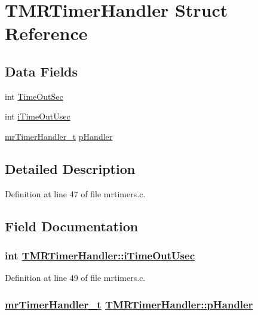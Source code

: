 \hypertarget{structTMRTimerHandler}{
\section{TMRTimer\-Handler Struct Reference}
\label{structTMRTimerHandler}
}
\subsection*{Data Fields}
\begin{CompactItemize}
\item 
int \hyperlink{structTMRTimerHandler_2da8162b04f70a60ac2bc7b37d97e5a1}{Time\-Out\-Sec}
\item 
int \hyperlink{structTMRTimerHandler_ceccedecb73edf56b8aece303bd50521}{i\-Time\-Out\-Usec}
\item 
\hyperlink{mrtimers_8h_9c199b5712594663db80db9a9ec6d6e0}{mr\-Timer\-Handler\_\-t} \hyperlink{structTMRTimerHandler_a96173b2d71794fe6ce4c1b4765e81e8}{p\-Handler}
\end{CompactItemize}


\subsection{Detailed Description}




Definition at line 47 of file mrtimers.c.

\subsection{Field Documentation}
\hypertarget{structTMRTimerHandler_ceccedecb73edf56b8aece303bd50521}{
\subsubsection[iTimeOutUsec]{\setlength{\rightskip}{0pt plus 5cm}int \hyperlink{structTMRTimerHandler_ceccedecb73edf56b8aece303bd50521}{TMRTimer\-Handler::i\-Time\-Out\-Usec}}}
\label{structTMRTimerHandler_ceccedecb73edf56b8aece303bd50521}




Definition at line 49 of file mrtimers.c.\hypertarget{structTMRTimerHandler_a96173b2d71794fe6ce4c1b4765e81e8}{
\subsubsection[pHandler]{\setlength{\rightskip}{0pt plus 5cm}\hyperlink{mrtimers_8h_9c199b5712594663db80db9a9ec6d6e0}{mr\-Timer\-Handler\_\-t} \hyperlink{structTMRTimerHandler_a96173b2d71794fe6ce4c1b4765e81e8}{TMRTimer\-Handler::p\-Handler}}}
\label{structTMRTimerHandler_a96173b2d71794fe6ce4c1b4765e81e8}




